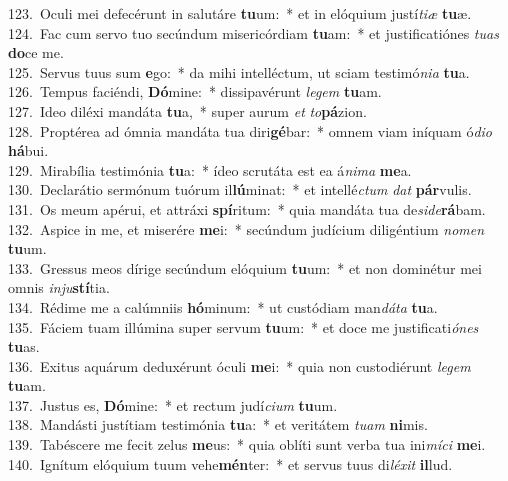 {123.~}Oculi mei defecérunt in salutáre \textbf{tu}um:~* et in elóquium justí\textit{ti}\textit{æ} \textbf{tu}æ.\\
{124.~}Fac cum servo tuo secúndum misericórdiam \textbf{tu}am:~* et justificatiónes \textit{tu}\textit{as} \textbf{do}ce me.\\
{125.~}Servus tuus sum \textbf{e}go:~* da mihi intelléctum, ut sciam testimó\textit{ni}\textit{a} \textbf{tu}a.\\
{126.~}Tempus faciéndi, \textbf{Dó}mine:~* dissipavérunt \textit{le}\textit{gem} \textbf{tu}am.\\
{127.~}Ideo diléxi mandáta \textbf{tu}a,~* super aurum \textit{et} \textit{to}\textbf{pá}zion.\\
{128.~}Proptérea ad ómnia mandáta tua diri\textbf{gé}bar:~* omnem viam iníquam ó\textit{di}\textit{o} \textbf{há}bui.\\
{129.~}Mirabília testimónia \textbf{tu}a:~* ídeo scrutáta est ea á\textit{ni}\textit{ma} \textbf{me}a.\\
{130.~}Declarátio sermónum tuórum il\textbf{lú}minat:~* et intellé\textit{ctum} \textit{dat} \textbf{pár}vulis.\\
{131.~}Os meum apérui, et attráxi \textbf{spí}ritum:~* quia mandáta tua de\textit{si}\textit{de}\textbf{rá}bam.\\
{132.~}Aspice in me, et miserére \textbf{me}i:~* secúndum judícium diligéntium \textit{no}\textit{men} \textbf{tu}um.\\
{133.~}Gressus meos dírige secúndum elóquium \textbf{tu}um:~* et non dominétur mei omnis \textit{in}\textit{ju}\textbf{stí}tia.\\
{134.~}Rédime me a calúmniis \textbf{hó}minum:~* ut custódiam man\textit{dá}\textit{ta} \textbf{tu}a.\\
{135.~}Fáciem tuam illúmina super servum \textbf{tu}um:~* et doce me justificati\textit{ó}\textit{nes} \textbf{tu}as.\\
{136.~}Exitus aquárum deduxérunt óculi \textbf{me}i:~* quia non custodiérunt \textit{le}\textit{gem} \textbf{tu}am.\\
{137.~}Justus es, \textbf{Dó}mine:~* et rectum judí\textit{ci}\textit{um} \textbf{tu}um.\\
{138.~}Mandásti justítiam testimónia \textbf{tu}a:~* et veritátem \textit{tu}\textit{am} \textbf{ni}mis.\\
{139.~}Tabéscere me fecit zelus \textbf{me}us:~* quia oblíti sunt verba tua ini\textit{mí}\textit{ci} \textbf{me}i.\\
{140.~}Ignítum elóquium tuum vehe\textbf{mén}ter:~* et servus tuus di\textit{lé}\textit{xit} \textbf{il}lud.\\
